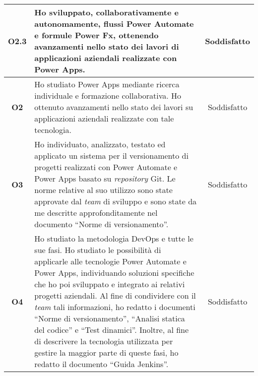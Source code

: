 \begin{longtable}{|c|p{8cm}|c|}
    \hline O2.3  & Ho sviluppato, collaborativamente e autonomamente, flussi Power Automate e formule Power Fx, ottenendo avanzamenti nello stato dei lavori di applicazioni aziendali realizzate con Power Apps. & Soddisfatto\\
    \hline \textbf{O2}  & Ho studiato Power Apps mediante ricerca individuale e formazione collaborativa. Ho ottenuto avanzamenti nello stato dei lavori su applicazioni aziendali realizzate con tale tecnologia. & Soddisfatto\\
    \hline \textbf{O3}  & Ho individuato, analizzato, testato ed applicato un sistema per il versionamento di progetti realizzati con Power Automate e Power Apps basato su \emph{repository} Git. Le norme relative al suo utilizzo sono state approvate dal \emph{team} di sviluppo e sono state da me descritte approfonditamente nel documento “Norme di versionamento”. & Soddisfatto\\
    \hline \textbf{O4}  & Ho studiato la metodologia \gls{DevOps} e tutte le sue fasi. Ho studiato le possibilità di applicarle alle tecnologie Power Automate e Power Apps, individuando soluzioni specifiche che ho poi sviluppato e integrato ai relativi progetti aziendali. Al fine di condividere con il \emph{team} tali informazioni, ho redatto i documenti “Norme di versionamento”, “Analisi statica del codice” e “Test dinamici”. Inoltre, al fine di descrivere la tecnologia utilizzata per gestire la maggior parte di queste fasi, ho redatto il documento “Guida Jenkins”. & Soddisfatto\\
\end{longtable}

